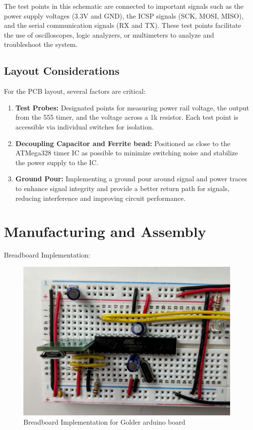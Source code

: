 \documentclass[a4paper,11pt]{article}%
\begin{document}
\begin{enumerate}
	      The test points in this schematic are connected to important signals such as the power supply voltages (3.3V and GND), the ICSP signals (SCK, MOSI, MISO), and the serial communication signals (RX and TX). These test points facilitate the use of oscilloscopes, logic analyzers, or multimeters to analyze and troubleshoot the system.
\end{enumerate}


\subsection{Layout Considerations}
For the PCB layout, several factors are critical:

\begin{enumerate}
	\item \textbf{Test Probes:} Designated points for measuring power rail voltage, the output from the 555 timer, and the voltage across a 1k resistor. Each test point is accessible via individual switches for isolation.
	\item \textbf{Decoupling Capacitor and Ferrite bead:} Positioned as close to the ATMega328 timer IC as possible to minimize switching noise and stabilize the power supply to the IC.
	\item \textbf{Ground Pour:} Implementing a ground pour around signal and power traces to enhance signal integrity and provide a better return path for signals, reducing interference and improving circuit performance.
\end{enumerate}


\pagebreak
\section{Manufacturing and Assembly}

Breadboard Implementation:


\begin{figure}[H]
	\centering
	\includegraphics[scale=0.15]{figures/breadboard.jpg}
	\caption{Breadboard Implementation for Golder arduino board}
\end{figure}
\end{document}
